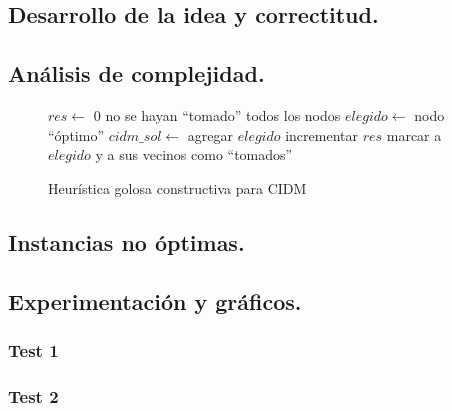 \subsection{Desarrollo de la idea y correctitud.}

\vspace*{0.3cm}


 
\vspace*{0.6cm}


\subsection{Análisis de complejidad.}

\vspace*{0.3cm}

\begin{figure}
\begin{codebox}
\li $res \leftarrow$ 0
\li \While no se hayan ``tomado'' todos los nodos
\li 	\Do 
 		$elegido \leftarrow$ nodo ``óptimo''
\li 		$cidm\_sol \leftarrow$ agregar $elegido$
\li 		incrementar $res$
\li 		marcar a $elegido$ y a sus vecinos como ``tomados''
	\End
\end{codebox}
\caption{Heurística golosa constructiva para CIDM}\label{code:goloso}
\end{figure}

\vspace*{0.6cm}

\subsection{Instancias no óptimas.}


\subsection{Experimentación y gráficos.}

\vspace*{0.3cm}


\subsubsection{Test 1}
\vspace*{0.3cm}

\vspace*{0.6cm}

\subsubsection{Test 2}

